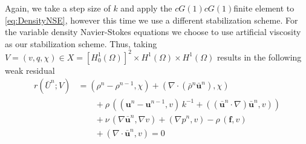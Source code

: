 Again, we take a step size of $k$ and apply the $cG(1)cG(1)$finite
element to \autoref{eq:DensityNSE}, however this time we use a different
stabilization scheme. For the variable density Navier-Stokes equations we
choose to use artificial viscosity as our stabilization scheme. Thus, taking
$V = (v, q, \chi) \in X = \left[ H^1_0(\Omega) \right]^2 \times H^1(\Omega)
\times H^1(\Omega)$ results in the following weak residual
\begin{equation}
    \begin{split}
        r(\bar{U}^n; V) &= (\rho^n - \rho^{n-1}, \chi)
            + (\nabla \cdot \left( \bar{\rho}^n \bar{\mathbf{u}}^n \right), \chi) \\
        &\qquad+  \rho\, \left(\left(\mathbf{u}^n
                - \mathbf{u}^{n-1}, v\right)\,k^{-1}
            + (\left( \bar{\mathbf{u}}^n \cdot \nabla \right)
                \bar{\mathbf{u}}^n, v)\right) \\
        &\qquad+ \nu\, (\nabla \bar{\mathbf{u}}^n, \nabla v)
            + (\nabla p^n, v) - \rho\, (\mathbf{f}, v) \\
        &\qquad+ (\nabla \cdot \bar{\mathbf{u}}^n, v) = 0
    \end{split}
    \label{eq:WeakRhoNSE}
\end{equation}

